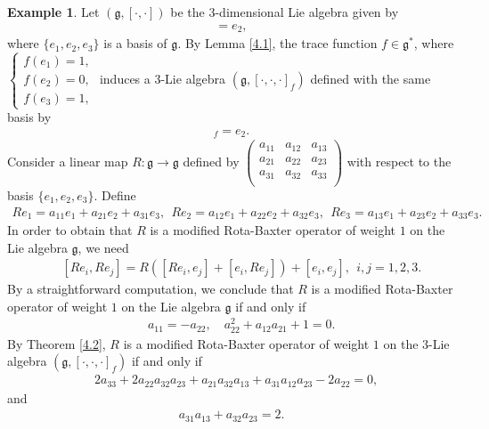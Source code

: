 \documentclass[12pt]{amsart}
\theoremstyle{definition}
\newtheorem{exam}[theorem]{Example}
\begin{document}
\begin{exam}
Let $(\mathfrak{g}, [\cdot, \cdot])$ be the 3-dimensional Lie algebra given by
\begin{eqnarray*}
[e_1, e_2]=e_2,
\end{eqnarray*}
where $\{e_1, e_2, e_3\}$ is a basis of $\mathfrak{g}$. By Lemma \ref{4.1}, the trace function $f\in \mathfrak{g}^{\ast}$, where
$\begin{cases}
f(e_1)=1,\\
f(e_2)=0,\\
f(e_3)=1,
\end{cases}$   induces
a 3-Lie algebra $(\mathfrak{g}, [\cdot, \cdot, \cdot]_f)$ defined with the same basis by
\begin{eqnarray*}
[e_1, e_2, e_3]_f=e_2.
\end{eqnarray*}
Consider a linear map $R: \mathfrak{g}\rightarrow \mathfrak{g}$ defined by
$\left(
                                            \begin{array}{ccc}
                                              a_{11} & a_{12} & a_{13}\\
                                             a_{21} & a_{22} & a_{23} \\
                                              a_{31} & a_{32} & a_{33} \\
                                            \end{array}
                                          \right)$ with respect to the basis $\{e_1, e_2, e_3\}$.
   Define
   \begin{eqnarray*}
Re_1 = a_{11}e_1 + a_{21}e_2 + a_{31}e_3,\ \  Re_2 = a_{12}e_1 + a_{22}e_2 + a_{32}e_3, \ \ Re_3 = a_{13}e_1 + a_{23}e_2 + a_{33}e_3.
   \end{eqnarray*}
In order to obtain that $R$ is a modified Rota-Baxter operator of weight $1$ on the Lie algebra $\mathfrak{g}$, we need
\begin{eqnarray*}
&&[Re_i, Re_j] = R([Re_i, e_j] + [e_i, Re_j])+[e_i, e_j],\ \  i, j=1,2,3.
\end{eqnarray*}
By a straightforward computation, we conclude that $R$ is a modified Rota-Baxter operator of weight $1$  on the Lie algebra $\mathfrak{g}$ if and
only if
\begin{eqnarray*}
&&  a_{11}=-a_{22}, \quad  a_{22}^2+a_{12}a_{21}+1=0.
\end{eqnarray*}
By Theorem \ref{4.2},  $R$ is  a modified Rota-Baxter operator of weight $1$ on the 3-Lie algebra $(\mathfrak{g}, [\cdot, \cdot, \cdot]_f)$ if and only if
\begin{align*}
&2a_{33}+2a_{22}a_{32}a_{23} + a_{21}a_{32}a_{13} + a_{31}a_{12}a_{23}-2a_{22}=0,
\end{align*}
and
\begin{align*}
 a_{31}a_{13}+a_{32}a_{23}=2.
 \end{align*}
\end{exam}
\end{document}
